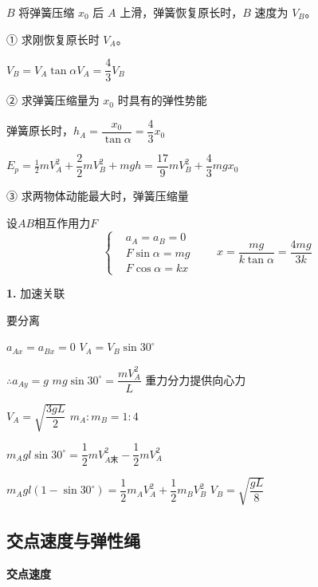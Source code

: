 \begin{problem}[{[3]}]
$B$ 将弹簧压缩 $x_0$ 后 $A$ 上滑，弹簧恢复原长时，$B$ 速度为 $V_B$。

\noindent ① 求刚恢复原长时 $V_A$。

\noindent $V_B=V_A\tan\alpha$\qquad $V_A=\dfrac43V_B$

\noindent ② 求弹簧压缩量为 $x_0$ 时具有的弹性势能

\noindent 弹簧原长时，$h_A=\dfrac{x_0}{\tan\alpha}=\dfrac43x_0$

\noindent $E_p=\tfrac12mV_A^{2}+\dfrac{2}{2}mV_B^{2}+mgh=\dfrac{17}{9}mV_B^{2}+\dfrac43mgx_0$

\noindent ③ 求两物体动能最大时，弹簧压缩量

\noindent 设$AB$相互作用力$F$
\[
\left\{\begin{aligned}
&a_A=a_B=0\\
&F\sin\alpha=mg\\
&F\cos\alpha=kx
\end{aligned}\right.\qquad x=\frac{mg}{k\tan\alpha}=\frac{4mg}{3k}
\]
\end{problem}

\textbf{1.} 加速关联

要分离

$a_{Ax}=a_{Bx}=0$ \qquad $V_A=V_B\sin30^\circ$ %

$\therefore a_{Ay}=g$ \qquad $mg\sin30^\circ=\dfrac{mV_A^{2}}{L}$ 重力分力提供向心力

$V_A=\sqrt{\dfrac{3gL}{2}}$ \qquad $m_A:m_B=1:4$ %

$m_Agl\sin30^\circ=\dfrac12 mV_{A\text{末}}^{2}-\dfrac12 mV_A^{2}$ %

$m_Agl(1-\sin30^\circ)=\dfrac12 m_AV_A^{2}+\dfrac12 m_BV_B^{2}$ \qquad $V_B=\sqrt{\dfrac{gL}{8}}$

\subsection{交点速度与弹性绳}
\textbf{交点速度}%

